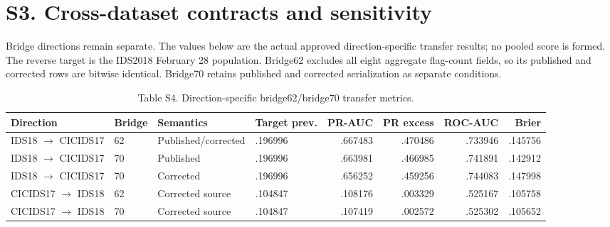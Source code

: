 \documentclass[preprint,12pt]{elsarticle}
\begin{document}
\section*{S3. Cross-dataset contracts and sensitivity}
Bridge directions remain separate. The values below are the actual approved direction-specific transfer results; no pooled score is formed. The reverse target is the IDS2018 February 28 population. Bridge62 excludes all eight aggregate flag-count fields, so its published and corrected rows are bitwise identical. Bridge70 retains published and corrected serialization as separate conditions.

\begin{table}[htbp]
\centering\tiny
\caption{Table S4. Direction-specific bridge62/bridge70 transfer metrics.}
\begin{tabular}{@{}llllrrrr@{}}
\toprule
Direction & Bridge & Semantics & Target prev. & PR-AUC & PR excess & ROC-AUC & Brier\\
\midrule
IDS18 $\rightarrow$ CICIDS17 & 62 & Published/corrected & .196996 & .667483 & .470486 & .733946 & .145756\\
IDS18 $\rightarrow$ CICIDS17 & 70 & Published & .196996 & .663981 & .466985 & .741891 & .142912\\
IDS18 $\rightarrow$ CICIDS17 & 70 & Corrected & .196996 & .656252 & .459256 & .744083 & .147998\\
CICIDS17 $\rightarrow$ IDS18 & 62 & Corrected source & .104847 & .108176 & .003329 & .525167 & .105758\\
CICIDS17 $\rightarrow$ IDS18 & 70 & Corrected source & .104847 & .107419 & .002572 & .525302 & .105652\\
\bottomrule
\end{tabular}
\end{table}
\end{document}
